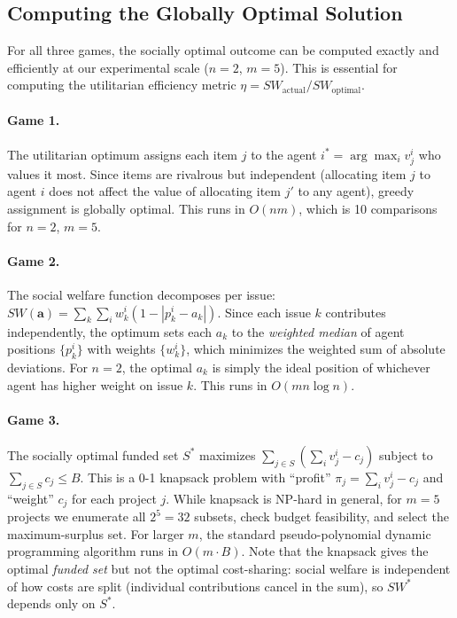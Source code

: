 \subsection{Computing the Globally Optimal Solution}
\label{sec:optimal_computation}

For all three games, the socially optimal outcome can be computed exactly and efficiently at our experimental scale ($n = 2$, $m = 5$).
This is essential for computing the utilitarian efficiency metric $\eta = SW_{\text{actual}} / SW_{\text{optimal}}$.

\paragraph{Game 1.}
The utilitarian optimum assigns each item $j$ to the agent $i^* = \arg\max_i v^i_j$ who values it most.
Since items are rivalrous but independent (allocating item $j$ to agent $i$ does not affect the value of allocating item $j'$ to any agent), greedy assignment is globally optimal.
This runs in $O(nm)$, which is 10 comparisons for $n=2$, $m=5$.

\paragraph{Game 2.}
The social welfare function decomposes per issue: $SW(\bm{a}) = \sum_k \sum_i w^i_k (1 - |p^i_k - a_k|)$.
Since each issue $k$ contributes independently, the optimum sets each $a_k$ to the \emph{weighted median} of agent positions $\{p^i_k\}$ with weights $\{w^i_k\}$, which minimizes the weighted sum of absolute deviations.
For $n = 2$, the optimal $a_k$ is simply the ideal position of whichever agent has higher weight on issue $k$.
This runs in $O(mn \log n)$.

\paragraph{Game 3.}
The socially optimal funded set $S^*$ maximizes $\sum_{j \in S} (\sum_i v^i_j - c_j)$ subject to $\sum_{j \in S} c_j \leq B$.
This is a 0-1 knapsack problem with ``profit'' $\pi_j = \sum_i v^i_j - c_j$ and ``weight'' $c_j$ for each project $j$.
While knapsack is NP-hard in general, for $m = 5$ projects we enumerate all $2^5 = 32$ subsets, check budget feasibility, and select the maximum-surplus set.
For larger $m$, the standard pseudo-polynomial dynamic programming algorithm runs in $O(m \cdot B)$.
Note that the knapsack gives the optimal \emph{funded set} but not the optimal cost-sharing: social welfare is independent of how costs are split (individual contributions cancel in the sum), so $SW^*$ depends only on $S^*$.

